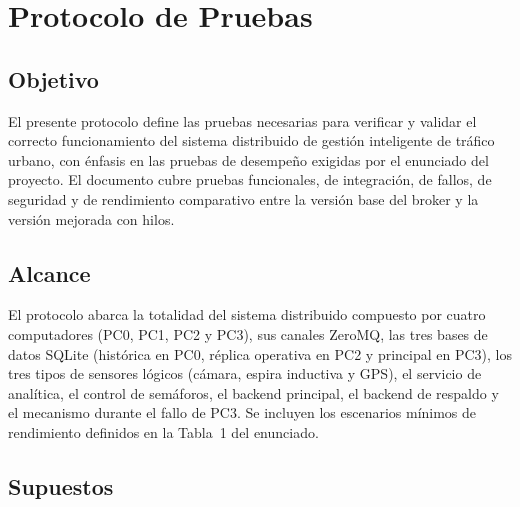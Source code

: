 \documentclass[12pt, a4paper]{article}
\begin{document}
\section{Protocolo de Pruebas}

\subsection{Objetivo}

El presente protocolo define las pruebas necesarias para verificar y validar el correcto funcionamiento del sistema distribuido de gestión inteligente de tráfico urbano, con énfasis en las pruebas de desempeño exigidas por el enunciado del proyecto. El documento cubre pruebas funcionales, de integración, de fallos, de seguridad y de rendimiento comparativo entre la versión base del broker y la versión mejorada con hilos.

\subsection{Alcance}

El protocolo abarca la totalidad del sistema distribuido compuesto por cuatro computadores (PC0, PC1, PC2 y PC3), sus canales ZeroMQ, las tres bases de datos SQLite (histórica en PC0, réplica operativa en PC2 y principal en PC3), los tres tipos de sensores lógicos (cámara, espira inductiva y GPS), el servicio de analítica, el control de semáforos, el backend principal, el backend de respaldo y el mecanismo durante el fallo de PC3. Se incluyen los escenarios mínimos de rendimiento definidos en la Tabla~1 del enunciado.

\subsection{Supuestos}
\end{document}
